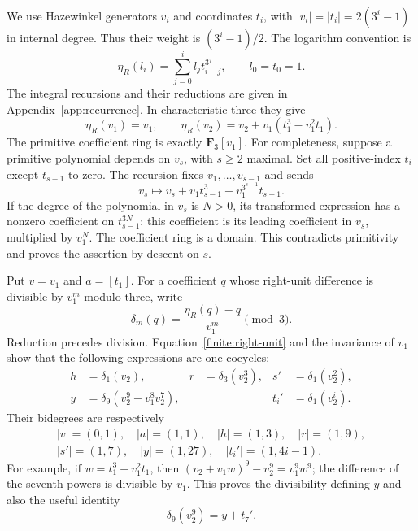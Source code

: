 \documentclass[11pt]{article}
\theoremstyle{definition}
\theoremstyle{remark}
\numberwithin{equation}{section}
\begin{document}
We use Hazewinkel generators $v_i$ and coordinates $t_i$, with
$|v_i|=|t_i|=2(3^i-1)$ in internal degree.  Thus their weight is
$(3^i-1)/2$.  The logarithm convention is
\[
 \eta_R(l_i)=\sum_{j=0}^i l_jt_{i-j}^{3^j},\qquad l_0=t_0=1.
\]
The integral recursions and their reductions are given in
Appendix~\ref{app:recurrence}.  In characteristic three they give
\begin{equation}\label{finite:right-unit}
 \eta_R(v_1)=v_1,\qquad
 \eta_R(v_2)=v_2+v_1(t_1^3-v_1^2t_1).
\end{equation}
The primitive coefficient ring is exactly $\mathbf F_3[v_1]$.  For
completeness, suppose a primitive polynomial depends on $v_s$, with
$s\geq2$ maximal.  Set all positive-index $t_i$ except $t_{s-1}$ to
zero.  The recursion fixes $v_1,\ldots,v_{s-1}$ and sends
\[
 v_s\longmapsto v_s+v_1t_{s-1}^3-v_1^{3^{s-1}}t_{s-1}.
\]
If the degree of the polynomial in $v_s$ is $N>0$, its transformed
expression has a nonzero coefficient on $t_{s-1}^{3N}$: this
coefficient is its leading coefficient in $v_s$, multiplied by
$v_1^N$.  The coefficient ring is a domain.  This contradicts
primitivity and proves the assertion by descent on $s$.

Put $v=v_1$ and $a=[t_1]$.  For a coefficient $q$ whose right-unit
difference is divisible by $v_1^m$ modulo three, write
\[
 \delta_m(q)=\frac{\eta_R(q)-q}{v_1^m}\pmod3.
\]
Reduction precedes division.  Equation~\eqref{finite:right-unit} and
the invariance of $v_1$ show that the following expressions are
one-cocycles:
\begin{align*}
 h&=\delta_1(v_2),& r&=\delta_3(v_2^3),&
 s'&=\delta_1(v_2^2),\\
y&=\delta_9(v_2^9-v_1^8v_2^7),&&&
 t_i'&=\delta_1(v_2^i).
\end{align*}
Their bidegrees are respectively
\begin{gather*}
 |v|=(0,1),\quad |a|=(1,1),\quad |h|=(1,3),\quad |r|=(1,9),\\
 |s'|=(1,7),\quad |y|=(1,27),\quad |t_i'|=(1,4i-1).
\end{gather*}
For example, if $w=t_1^3-v_1^2t_1$, then
$(v_2+v_1w)^9-v_2^9=v_1^9w^9$; the difference of the seventh powers
is divisible by $v_1$.  This proves the divisibility defining $y$ and
also the useful identity
\begin{equation}\label{finite:corrected-y}
 \delta_9(v_2^9)=y+t_7'.
\end{equation}
\end{document}

